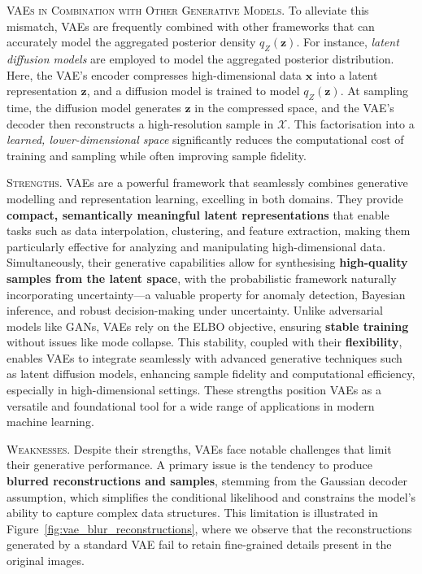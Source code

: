 \textsc{VAEs in Combination with Other Generative Models.} To alleviate this mismatch, VAEs are frequently combined with other frameworks that can accurately model the aggregated posterior density \(q_{Z}(\mathbf{z})\). For instance, \textit{latent diffusion models} \cite{rombach2022high} are employed to model the aggregated posterior distribution. Here, the VAE’s encoder compresses high-dimensional data \(\mathbf{x}\) into a latent representation \(\mathbf{z}\), and a diffusion model is trained to model \(q_{Z}(\mathbf{z})\). At sampling time, the diffusion model generates \(\mathbf{z}\) in the compressed space, and the VAE’s decoder then reconstructs a high-resolution sample in \(\mathcal{X}\). This factorisation into a \emph{learned, lower-dimensional space} significantly reduces the computational cost of training and sampling while often improving sample fidelity.

\textsc{Strengths.} VAEs are a powerful framework that seamlessly combines generative modelling and representation learning, excelling in both domains. They provide \textbf{compact, semantically meaningful latent representations} that enable tasks such as data interpolation, clustering, and feature extraction, making them particularly effective for analyzing and manipulating high-dimensional data. Simultaneously, their generative capabilities allow for synthesising \textbf{high-quality samples from the latent space}, with the probabilistic framework naturally incorporating uncertainty—a valuable property for anomaly detection, Bayesian inference, and robust decision-making under uncertainty. Unlike adversarial models like GANs, VAEs rely on the ELBO objective, ensuring \textbf{stable training} without issues like mode collapse. This stability, coupled with their \textbf{flexibility}, enables VAEs to integrate seamlessly with advanced generative techniques such as latent diffusion models, enhancing sample fidelity and computational efficiency, especially in high-dimensional settings. These strengths position VAEs as a versatile and foundational tool for a wide range of applications in modern machine learning.

\textsc{Weaknesses.} Despite their strengths, VAEs face notable challenges that limit their generative performance. A primary issue is the tendency to produce \textbf{blurred reconstructions and samples}, stemming from the Gaussian decoder assumption, which simplifies the conditional likelihood and constrains the model's ability to capture complex data structures. This limitation is illustrated in Figure~\ref{fig:vae_blur_reconstructions}, where we observe that the reconstructions generated by a standard VAE fail to retain fine-grained details present in the original images. 

